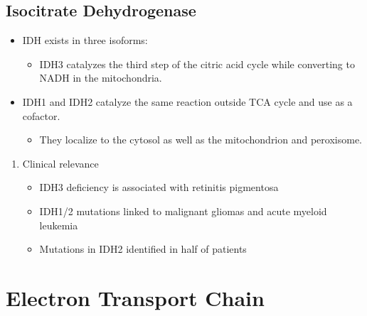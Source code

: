 \documentclass{scrartcl}
\begin{document}
\subsection{Isocitrate Dehydrogenase}
\label{sec:orgf05b77f}
\begin{itemize}
\item IDH exists in three isoforms:
\begin{itemize}
\item IDH3 catalyzes the third step of the citric acid cycle while converting  to NADH in the mitochondria.
\end{itemize}
\end{itemize}


\begin{itemize}
\item IDH1 and IDH2 catalyze the same reaction outside TCA cycle and use  as a cofactor.
\begin{itemize}
\item They localize to the cytosol as well as the mitochondrion and peroxisome.
\end{itemize}
\end{itemize}


\begin{enumerate}
\item Clinical relevance
\label{sec:org9f59dec}
\begin{itemize}
\item IDH3 deficiency is associated with retinitis pigmentosa
\item IDH1/2 mutations linked to malignant gliomas and acute myeloid leukemia
\item Mutations in IDH2 identified in half of patients
\end{itemize}
\end{enumerate}
\section{Electron Transport Chain}
\label{sec:org76a060b}
\end{document}
